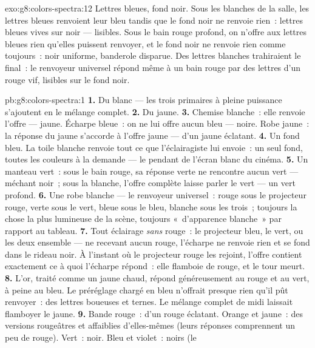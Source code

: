\begin{solution}{exo:g8:colors-spectra:12}
Lettres bleues, fond noir. Sous les  blanches de la salle, les
lettres bleues renvoient leur bleu tandis que le fond noir ne renvoie
rien~: lettres bleues vives sur noir --- lisibles. Sous le bain rouge
profond, on n'offre aux lettres bleues rien qu'elles puissent
renvoyer, et le fond noir ne renvoie rien comme toujours~: noir
uniforme, banderole disparue. Des lettres blanches trahiraient le
final~: le renvoyeur universel répond même à un bain rouge par des
lettres d'un rouge vif, lisibles sur le fond noir.
\end{solution}

\begin{solution}{pb:g8:colors-spectra:1}
\textbf{1.} Du blanc --- les trois primaires à pleine puissance
s'ajoutent en le mélange complet.
\textbf{2.} Du jaune.
\textbf{3.} Chemise blanche~: elle renvoie l'offre --- jaune. Écharpe
bleue~: on ne lui offre aucun bleu --- noire. Robe jaune~: la réponse
du jaune s'accorde à l'offre jaune --- d'un jaune éclatant.
\textbf{4.} Un fond bleu. La toile blanche renvoie tout ce que
l'éclairagiste lui envoie~: un seul fond, toutes les couleurs à la
demande --- le pendant de l'écran blanc du cinéma.
\textbf{5.} Un manteau vert~: sous le bain rouge, sa réponse verte ne
rencontre aucun vert --- méchant noir~; sous la  blanche,
l'offre complète laisse parler le vert --- un vert profond.
\textbf{6.} Une robe blanche --- le renvoyeur universel~: rouge sous
le projecteur rouge, verte sous le vert, bleue sous le bleu, blanche
sous les trois~; toujours la chose la plus lumineuse de la scène,
toujours «~d'apparence blanche~» par rapport au tableau.
\textbf{7.} Tout éclairage \emph{sans} rouge~: le projecteur bleu, le
vert, ou les deux ensemble --- ne recevant aucun rouge, l'écharpe ne
renvoie rien et se fond dans le rideau noir. À l'instant où le
projecteur rouge les rejoint, l'offre contient exactement ce à quoi
l'écharpe répond~: elle flamboie de rouge, et le tour meurt.
\textbf{8.} L'or, traité comme un jaune chaud, répond généreusement au
rouge et au vert, à peine au bleu. Le préréglage chargé en bleu
n'offrait presque rien qu'il pût renvoyer~: des lettres boueuses et
ternes. Le mélange complet de midi laissait flamboyer le jaune.
\textbf{9.} Bande rouge~: d'un rouge éclatant. Orange et jaune~: des
versions rougeâtres et affaiblies d'elles-mêmes (leurs réponses
comprennent un peu de rouge). Vert~: noir. Bleu et violet~: noirs (le

\end{solution}
